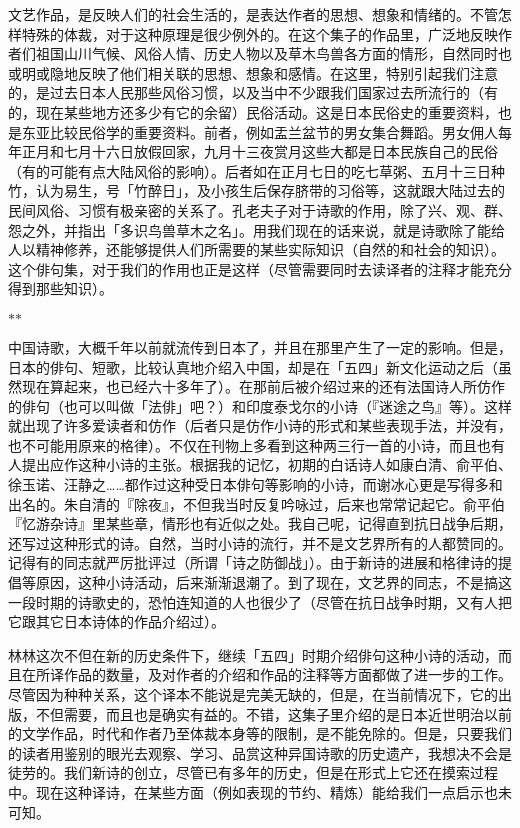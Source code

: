 {    文艺作品，是反映人们的社会生活的，是表达作者的思想、想象和情绪的。不管怎样特殊的体裁，对于这种原理是很少例外的。在这个集子的作品里，广泛地反映作者们祖国山川气候、风俗人情、历史人物以及草木鸟兽各方面的情形，自然同时也或明或隐地反映了他们相关联的思想、想象和感情。在这里，特别引起我们注意的，是过去日本人民那些风俗习惯，以及当中不少跟我们国家过去所流行的（有的，现在某些地方还多少有它的余留）民俗活动。这是日本民俗史的重要资料，也是东亚比较民俗学的重要资料。前者，例如盂兰盆节的男女集合舞蹈。男女佣人每年正月和七月十六日放假回家，九月十三夜赏月这些大都是日本民族自己的民俗（有的可能有点大陆风俗的影响）。后者如在正月七日的吃七草粥、五月十三日种竹，认为易生，号「竹醉日」，及小孩生后保存脐带的习俗等，这就跟大陆过去的民间风俗、习惯有极亲密的关系了。孔老夫子对于诗歌的作用，除了兴、观、群、怨之外，并指出「多识鸟兽草木之名」。用我们现在的话来说，就是诗歌除了能给人以精神修养，还能够提供人们所需要的某些实际知识（自然的和社会的知识）。这个俳句集，对于我们的作用也正是这样（尽管需要同时去读译者的注释才能充分得到那些知识）。

    \centerline{\hfill$*$\hfill$*$\hfill}

    中国诗歌，大概千年以前就流传到日本了，并且在那里产生了一定的影响。但是，日本的俳句、短歌，比较认真地介绍入中国，却是在「五四」新文化运动之后（虽然现在算起来，也已经六十多年了）。在那前后被介绍过来的还有法国诗人所仿作的俳句（也可以叫做「法俳」吧？）和印度泰戈尔的小诗（『迷途之鸟』等）。这样就出现了许多爱读者和仿作（后者只是仿作小诗的形式和某些表现手法，并没有，也不可能用原来的格律）。不仅在刊物上多看到这种两三行一首的小诗，而且也有人提出应作这种小诗的主张。根据我的记忆，初期的白话诗人如康白清、俞平伯、徐玉诺、汪静之……都作过这种受日本俳句等影响的小诗，而谢冰心更是写得多和出名的。朱自清的『除夜』，不但我当时反复吟咏过，后来也常常记起它。俞平伯『忆游杂诗』里某些章，情形也有近似之处。我自己呢，记得直到抗日战争后期，还写过这种形式的诗。自然，当时小诗的流行，并不是文艺界所有的人都赞同的。记得有的同志就严厉批评过（所谓「诗之防御战」）。由于新诗的进展和格律诗的提倡等原因，这种小诗活动，后来渐渐退潮了。到了现在，文艺界的同志，不是搞这一段时期的诗歌史的，恐怕连知道的人也很少了（尽管在抗日战争时期，又有人把它跟其它日本诗体的作品介绍过）。

    林林这次不但在新的历史条件下，继续「五四」时期介绍俳句这种小诗的活动，而且在所译作品的数量，及对作者的介绍和作品的注释等方面都做了进一步的工作。尽管因为种种关系，这个译本不能说是完美无缺的，但是，在当前情况下，它的出版，不但需要，而且也是确实有益的。不错，这集子里介绍的是日本近世明治以前的文学作品，时代和作者乃至体裁本身等的限制，是不能免除的。但是，只要我们的读者用鉴别的眼光去观察、学习、品赏这种异国诗歌的历史遗产，我想决不会是徒劳的。我们新诗的创立，尽管已有多年的历史，但是在形式上它还在摸索过程中。现在这种译诗，在某些方面（例如表现的节约、精炼）能给我们一点启示也未可知。

}
